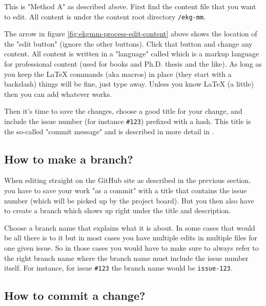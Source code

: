 This is "Method A" as described above.
First find the content file that you want to edit.
All content is under the content root directory \texttt{/ekg-mm}.

The arrow in figure \ref{fig:ekgmm-process-edit-content} above shows the
location of the "edit button" (ignore the other buttons). 
Click that button and change any content. 
All content is written in a "language" called  which is
a markup language for professional content (used for books and Ph.D. 
thesis and the like).
As long as you keep the LaTeX commands (aka macros) in place (they 
start with a backslash) things will be fine, just type away. 
Unless you know LaTeX (a little) then you can add whatever works.

Then it’s time to save the changes, choose a good title for your 
change, and include the issue number (for instance \texttt{\#123})
prefixed with a hash.
This title is the so-called "commit message" and is described in 
more detail in .

\subsection{How to make a branch?}
\label{subsec:ekg-mm-process-how-to-make-a-branch}

When editing straight on the GitHub site as described in the previous 
section, you have to save your work "as a commit" with a title that 
contains the issue number (which will be picked up by the project board). 
But you then also have to create a branch which shows up right under 
the title and description. 

Choose a branch name that explains what it is about. 
In some cases that would be all there is to it but in most cases you 
have multiple edits in multiple files for one given issue. 
So in those cases you would have to make sure to always refer to 
the right branch name where the branch name must include the 
issue number itself. 
For instance, for issue \texttt{\#123} the branch name would 
be \texttt{issue-123}.

\subsection{How to commit a change?}
\label{subsec:ekg-mm-process-how-to-commit}

